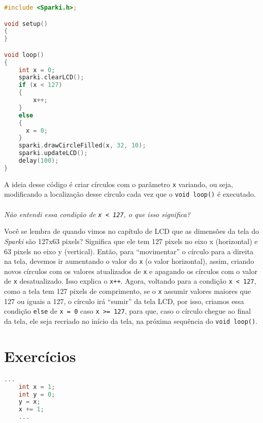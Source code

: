     \begin{lstlisting}[language=C]
#include <Sparki.h>;

void setup()
{
}

void loop()
{
    int x = 0;
    sparki.clearLCD();
    if (x < 127) 
    {
        x++;
    }
    else
    {
      x = 0;
    }
    sparki.drawCircleFilled(x, 32, 10);
    sparki.updateLCD();
    delay(100);
}
\end{lstlisting}

    A ideia desse código é criar círculos com o parâmetro \lstinline[columns=fixed]{x} variando, ou seja, modificando a localização desse círculo cada vez que o \lstinline[columns=fixed]{void loop()} é executado.
    \\~\\
    \textit{Não entendi essa condição de \lstinline[columns=fixed]{x < 127}, o que isso significa?} \par
    Você se lembra de quando vimos no capítulo de LCD que as dimensões da tela do \textit{Sparki} são 127x63 pixels? Significa que ele tem 127 pixels no eixo x (horizontal) e 63 pixels no eixo y (vertical). Então, para ``movimentar'' o círculo para a direita na tela, devemos ir aumentando o valor do \lstinline[columns=fixed]{x} (o valor horizontal), assim, criando novos círculos com os valores atualizados de \lstinline[columns=fixed]{x} e apagando os círculos com o valor de \lstinline[columns=fixed]{x} desatualizado. Isso explica o \lstinline[columns=fixed]{x++}. Agora, voltando para a condição \lstinline[columns=fixed]{x < 127}, como a tela tem 127 pixels de comprimento, se o \lstinline[columns=fixed]{x} assumir valores maiores que 127 ou iguais a 127, o círculo irá ``sumir'' da tela LCD, por isso, criamos essa condição \lstinline[columns=fixed]{else} de \lstinline[columns=fixed]{x = 0} caso \lstinline[columns=fixed]{x >= 127}, para que, caso o círculo chegue ao final da tela, ele seja recriado no início da tela, na próxima sequência do \lstinline[columns=fixed]{void loop()}.
    
\section{Exercícios}


    \begin{lstlisting}[language=C]
    ...
    int x = 1;
    int y = 0;
    y = x;
    x += 1;
    ...
    \end{lstlisting}

